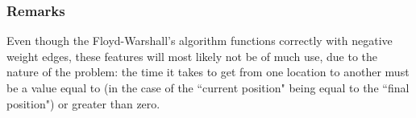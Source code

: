 \subsubsection{Remarks}
Even though the Floyd-Warshall's algorithm functions correctly with negative weight edges, these features will most likely not be of much use, due to the nature of the problem:
the time it takes to get from one location to another must be a value equal to (in the case of the ``current position" being equal to the ``final position") or greater than zero.